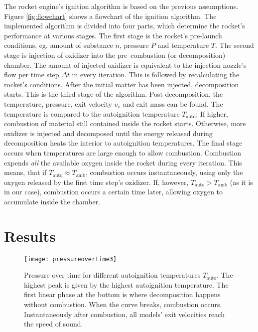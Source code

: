   The rocket engine's ignition algorithm is based on the previous assumptions. Figure \ref{fig:flowchart} shows a flowchart of the ignition algorithm. The implemented algorithm is divided into four parts, which determine the rocket's performance at various stages. The first stage is the rocket's pre-launch conditions, eg. amount of substance $n$, pressure $P$ and temperature $T$. The second stage is injection of oxidizer into the pre--combustion (or decomposition) chamber. The amount of injected oxidizer is equivalent to the injection nozzle's flow per time step $\Delta t$ in every iteration. This is followed by recalculating the rocket's conditions. After the initial matter has been injected, decomposition starts. This is the third stage of the algorithm. Post decomposition, the temperature, pressure, exit velocity $v_e$ and exit mass can be found. The temperature is compared to the autoignition temperature $T_\text{auto}$: If higher, combustion of material still contained inside the rocket starts. Otherwise, more oxidizer is injected and decomposed until the energy released during decomposition heats the interior to autoignition temperatures. The final stage occurs when temperatures are large enough to allow combustion. Combustion expends \emph{all} the available oxygen inside the rocket during every iteration. This means, that if $T_\text{auto} \approx T_\text{amb}$, combustion occurs instantaneously, using only the oxygen released by the first time step's oxidizer. If, however, $T_\text{auto} > T_\text{amb}$ (as it is in our case), combustion occurs a certain time later, allowing oxygen to accumulate inside the chamber.

\section{Results}

  \begin{figure}
  	\centering
  	\texttt{[image: pressureovertime3]}
  	\caption{Pressure over time for different autoignition temperatures $T_\text{auto}$. The highest peak is given by the highest autoignition temperature. The first linear phase at the bottom is where decomposition happens without combustion. When the curve breaks, combustion occurs. Instantaneously after combustion, all models' exit velocities reach the speed of sound.}
  	\label{fig:pressureovertime}
  \end{figure}

